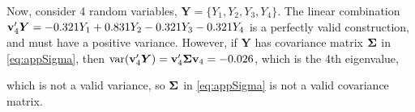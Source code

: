 \documentclass[11pt, titlepage]{article}\usepackage[]{graphicx}\usepackage[]{color}
\makeatletter
\newcommand{\hlnum}[1]{\textcolor[rgb]{0.686,0.059,0.569}{#1}}%
\newcommand{\hlopt}[1]{\textcolor[rgb]{0,0,0}{#1}}%
\newcommand{\hlstd}[1]{\textcolor[rgb]{0.345,0.345,0.345}{#1}}%
\newcommand{\hlkwb}[1]{\textcolor[rgb]{0.69,0.353,0.396}{#1}}%
\newcommand{\hlkwd}[1]{\textcolor[rgb]{0.737,0.353,0.396}{\textbf{#1}}}%
\newenvironment{kframe}{%
 \def\at@end@of@kframe{}%
 \ifinner\ifhmode%
  \def\at@end@of@kframe{\end{minipage}}%
  \begin{minipage}{\columnwidth}%
 \fi\fi%
 \def\FrameCommand##1{\hskip\@totalleftmargin \hskip-\fboxsep
 \colorbox{shadecolor}{##1}\hskip-\fboxsep
     \hskip-\linewidth \hskip-\@totalleftmargin \hskip\columnwidth}%
 \MakeFramed {\advance\hsize-\width
   \@totalleftmargin\z@ \linewidth\hsize
   \@setminipage}}%
 {\par\unskip\endMakeFramed%
 \at@end@of@kframe}
\newenvironment{knitrout}{}{} %
\makeatother
\begin{document}
\begin{spacing}{1.9}
Now, consider 4 random variables, $\bm Y = \{Y_1,Y_2,Y_3,Y_4\}$. The linear combination $\mathbf{v}_4^{\prime}\bm Y = -0.321Y_1 + 0.831Y_2 - 0.321Y_3 - 0.321Y_4$ is a perfectly valid construction, and must have a positive variance.  However, if $\bm Y$ has covariance matrix $\mbox{\boldmath $\Sigma$}$ in \ref{eq:appSigma}, then $\textrm{var}(\mathbf{v}_4^{\prime}\bm Y) = \mathbf{v}_4^{\prime}\mbox{\boldmath $\Sigma$}\mathbf{v}_4 = -0.026$, which is the 4th eigenvalue,
\noindent which is not a valid variance, so $\mbox{\boldmath $\Sigma$}$ in \ref{eq:appSigma} is not a valid covariance matrix.


\end{spacing}
\end{document}
